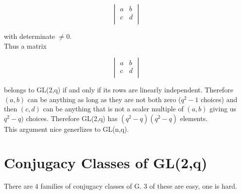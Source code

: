 \documentclass[12pt,twoside]{reedthesis}
\begin{document}
$$ \begin{vmatrix}
a&b\\
c&d\\
\end{vmatrix}
$$

with determinate $\neq{0}$.\\

Thus a matrix

$$ \begin{vmatrix}
a&b\\
c&d\\
\end{vmatrix}
$$

belongs to GL(2,q) if and only if its rows are linearly independent.  Therefore $(a,b)$ can be anything as long as they are not both zero ($q^2 -1$ choices) and then $(c,d)$ can be anything 
that is not a scaler multiple of $(a,b)$ giving us $q^2-q)$ choices.
Therefore GL(2,q) has $(q^2-q)(q^2-q)$ elements.\\
This argument nice generlizes to GL(n,q).

\section*{Conjugacy Classes of GL(2,q)}

There are 4 families of conjugacy classes of G.  3 of these are easy, one is hard.
\end{document}
